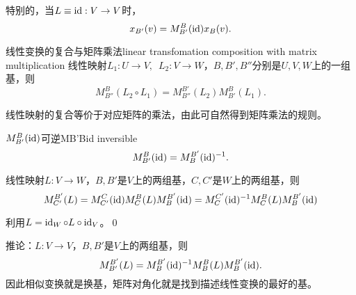 特别的，当$L\equiv\operatorname{id}:V\to V$时， 
\[
	x_{B'}(v)=M_{B'}^B(\operatorname{id})x_B(v).
\]
\begin{theorem}{线性变换的复合与矩阵乘法}{linear transfomation composition with matrix multiplication}
	线性映射$L_1:U\to V,\enspace L_2:V\to W$，$B,B',B''$分别是$U,V,W$上的一组基，则
	\[
		M_{B''}^B(L_2\circ L_1)=M_{B''}^{B'}(L_2)M_{B'}^B(L_1).
	\]
\end{theorem}
\noindent 线性映射的复合等价于对应矩阵的乘法，由此可自然得到矩阵乘法的规则。
\begin{theorem}{$M_{B'}^B(\operatorname{id})$可逆}{MB'Bid inversible}
	\[
		M_{B'}^B(\operatorname{id})=M_B^{B'}(\operatorname{id})^{-1}.
	\]
\end{theorem}
\begin{theorem}{}{}
	线性映射$L:V\to W$，$B,B'$是$V$上的两组基，$C,C'$是$W$上的两组基，则
	\[
		M_{C'}^{B'}(L)=M_{C'}^C(\operatorname{id})M_C^B(L)M_B^{B'}(\operatorname{id})=M_C^{C'}(\operatorname{id})^{-1} M_C^B(L)M_B^{B'}(\operatorname{id})
	\]
\end{theorem}
\prf 利用$L=\operatorname{id}_W\circ L\circ\operatorname{id}_V$。\qed

推论：$L:V\to V$，$B,B'$是$V$上的两组基，则
\[
	M_{B'}^{B'}(L)=M_B^{B'}(\operatorname{id})^{-1} M_B^B(L)M_B^{B'}(\operatorname{id}).
\]
因此相似变换就是换基，矩阵对角化就是找到描述线性变换的最好的基。
